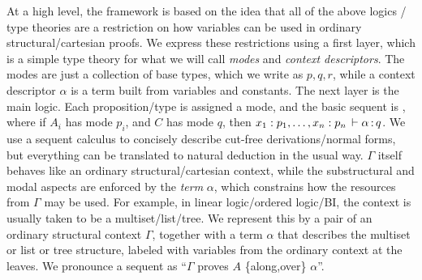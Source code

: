 At a high level, the framework is based on the idea that all of the
above logics / type theories are a restriction on how variables can be
used in ordinary structural/cartesian proofs.  We express these
restrictions using a first layer, which is a simple type theory for what
we will call \emph{modes} and \emph{context descriptors}.  The modes are
just a collection of base types, which we write as $p,q,r$, while a
context descriptor $\alpha$ is a term built from variables and
constants.  The next layer is the main logic.  Each proposition/type is
assigned a mode, and the basic sequent is , where if $A_i$ has mode $p_i$, and $C$ has mode $q$,
then $x_1 : p_1,\ldots, x_n : p_n \, \vdash \alpha \, \mathit{:} \, q$.  We use a sequent
calculus to concisely describe cut-free derivations/normal forms, but
everything can be translated to natural deduction in the usual way.
$\Gamma$ itself behaves like an ordinary structural/cartesian context,
while the substructural and modal aspects are enforced by the
\emph{term} $\alpha$, which constrains how the resources from $\Gamma$
may be used.  For example, in linear logic/ordered logic/BI, the context
is usually taken to be a multiset/list/tree.  We represent this by a
pair of an ordinary structural context $\Gamma$, together with a term
$\alpha$ that describes the multiset or list or tree structure, labeled
with variables from the ordinary context at the leaves.  We pronounce a
sequent  as ``$\Gamma$ proves $A$ \{along,over\}
$\alpha$''.

